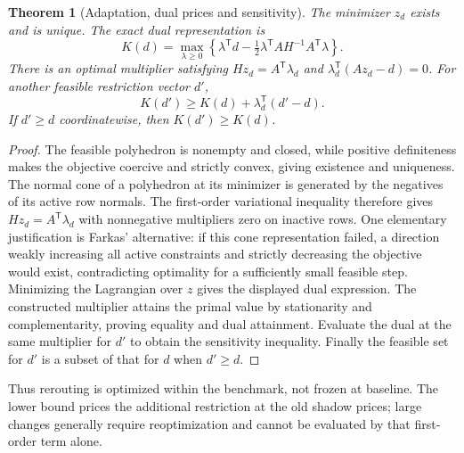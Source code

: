 \documentclass[11pt]{article}
\newtheorem{theorem}{Theorem}
\theoremstyle{definition}
\begin{document}
\begin{theorem}[Adaptation, dual prices and sensitivity]
The minimizer $z_d$ exists and is unique. The exact dual representation is
\[
 K(d)=\max_{\lambda\ge0}\left\{\lambda^{\mathsf T}d
 -\tfrac12\lambda^{\mathsf T}AH^{-1}A^{\mathsf T}\lambda\right\}.
\]
There is an optimal multiplier satisfying
$Hz_d=A^{\mathsf T}\lambda_d$ and
$\lambda_d^{\mathsf T}(Az_d-d)=0$.
For another feasible restriction vector $d'$,
\[
 K(d')\ge K(d)+\lambda_d^{\mathsf T}(d'-d).
\]
If $d'\ge d$ coordinatewise, then $K(d')\ge K(d)$.
\end{theorem}
\begin{proof}
The feasible polyhedron is nonempty and closed, while positive definiteness
makes the objective coercive and strictly convex, giving existence and
uniqueness. The normal cone of a polyhedron at its minimizer is generated
by the negatives of its active row normals. The first-order variational
inequality therefore gives $Hz_d=A^{\mathsf T}\lambda_d$ with nonnegative
multipliers zero on inactive rows. One elementary justification is Farkas'
alternative: if this cone representation failed, a direction weakly increasing
all active constraints and strictly decreasing the objective would exist,
contradicting optimality for a sufficiently small feasible step.
Minimizing the Lagrangian over $z$ gives the displayed dual expression.
The constructed multiplier attains the primal value by stationarity and
complementarity, proving equality and dual attainment. Evaluate the dual
at the same multiplier for $d'$ to obtain the sensitivity inequality.
Finally the feasible set for $d'$ is a subset of that for $d$ when $d'\ge d$.
\end{proof}

Thus rerouting is optimized within the benchmark, not frozen at baseline.
The lower bound prices the additional restriction at the old shadow prices;
large changes generally require reoptimization and cannot be evaluated by
that first-order term alone.
\end{document}
